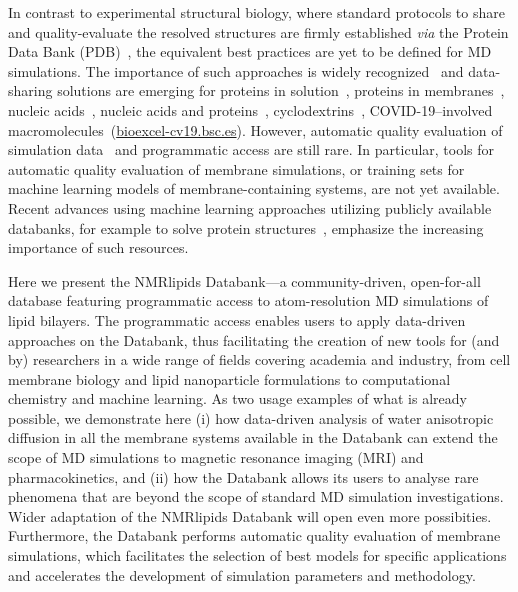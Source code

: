 \documentclass[fleqn,10pt]{wlscirep}
\begin{document}
In contrast to experimental structural biology, where standard protocols to share and quality-evaluate the resolved structures are firmly established \textit{via} the Protein Data Bank (PDB)~\cite{montelione13}, the equivalent best practices are yet to be defined for MD simulations. The importance of such approaches is widely recognized~\cite{feig99,tai04,silva06,abraham19,hildebrand19,hospital20,abriata20,espigares20} and data-sharing solutions are emerging for proteins in solution~\cite{meyer10,kamp10}, proteins in membranes~\cite{newport19,espigares20,leston22}, nucleic acids~\cite{hospital16}, nucleic acids and proteins~\cite{bekker20}, cyclodextrins~\cite{mixcoha16}, COVID-19--involved macromolecules~(\url{bioexcel-cv19.bsc.es}). However, automatic quality evaluation of simulation data~\cite{meyer10,hospital16} and programmatic access are still rare. In particular, tools for automatic quality evaluation of membrane simulations, or training sets for machine learning models of membrane-containing systems, are not yet available. Recent advances using machine learning approaches utilizing publicly available databanks, for example to solve protein structures~\cite{jumper21}, emphasize the increasing importance of such resources. 


Here we present the NMRlipids Databank---a community-driven, open-for-all database featuring programmatic access to atom-resolution MD simulations of lipid bilayers. The programmatic access enables users to apply data-driven approaches on the Databank, thus facilitating the creation of new tools for (and by) researchers in a wide range of fields covering academia and industry, from cell membrane biology and lipid nanoparticle formulations to computational chemistry and machine learning. As two usage examples of what is already possible, we demonstrate here (i) how data-driven analysis of water anisotropic diffusion in all the membrane systems available in the Databank can extend the scope of MD simulations to magnetic resonance imaging (MRI) and pharmacokinetics, and (ii) how the Databank allows its users to analyse rare phenomena that are beyond the scope of standard MD simulation investigations. Wider adaptation of the NMRlipids Databank will open even more possibities. Furthermore, the Databank performs automatic quality evaluation of membrane simulations, which facilitates the selection of best models for specific applications and accelerates the development of simulation parameters and methodology.  
\end{document}
